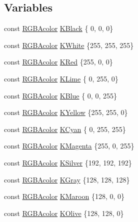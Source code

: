\subsection*{Variables}
\begin{DoxyCompactItemize}
\item 
const \hyperlink{classns_graphics_1_1_r_g_b_acolor}{R\+G\+B\+Acolor} \hyperlink{namespacens_graphics_abf1d83a5438e750a393a0333bd9d5bd8}{K\+Black} \{ 0, 0, 0\}
\item 
const \hyperlink{classns_graphics_1_1_r_g_b_acolor}{R\+G\+B\+Acolor} \hyperlink{namespacens_graphics_a8c5fcb477a548c6ed321748ec8383bb2}{K\+White} \{255, 255, 255\}
\item 
const \hyperlink{classns_graphics_1_1_r_g_b_acolor}{R\+G\+B\+Acolor} \hyperlink{namespacens_graphics_a2eb081113194e8ff44aebd697c2cfe61}{K\+Red} \{255, 0, 0\}
\item 
const \hyperlink{classns_graphics_1_1_r_g_b_acolor}{R\+G\+B\+Acolor} \hyperlink{namespacens_graphics_abfa46e909a7f8d4d908e70e4b55f734c}{K\+Lime} \{ 0, 255, 0\}
\item 
const \hyperlink{classns_graphics_1_1_r_g_b_acolor}{R\+G\+B\+Acolor} \hyperlink{namespacens_graphics_a64e9d947b926cdb9a7359e1d6f45a81e}{K\+Blue} \{ 0, 0, 255\}
\item 
const \hyperlink{classns_graphics_1_1_r_g_b_acolor}{R\+G\+B\+Acolor} \hyperlink{namespacens_graphics_a445ddb81e2a910db8e01a70403988966}{K\+Yellow} \{255, 255, 0\}
\item 
const \hyperlink{classns_graphics_1_1_r_g_b_acolor}{R\+G\+B\+Acolor} \hyperlink{namespacens_graphics_ac3f029049cd7ede1dfa2c788749029ad}{K\+Cyan} \{ 0, 255, 255\}
\item 
const \hyperlink{classns_graphics_1_1_r_g_b_acolor}{R\+G\+B\+Acolor} \hyperlink{namespacens_graphics_ad0a8ee009f367326525d2cbd47cd5dea}{K\+Magenta} \{255, 0, 255\}
\item 
const \hyperlink{classns_graphics_1_1_r_g_b_acolor}{R\+G\+B\+Acolor} \hyperlink{namespacens_graphics_a44884fe5a7841edbad80039e8ad4017c}{K\+Silver} \{192, 192, 192\}
\item 
const \hyperlink{classns_graphics_1_1_r_g_b_acolor}{R\+G\+B\+Acolor} \hyperlink{namespacens_graphics_a96ad8f5e0a09dba209c3359c277dcc6f}{K\+Gray} \{128, 128, 128\}
\item 
const \hyperlink{classns_graphics_1_1_r_g_b_acolor}{R\+G\+B\+Acolor} \hyperlink{namespacens_graphics_a219354b4276a9edbfc436390ba3a4827}{K\+Maroon} \{128, 0, 0\}
\item 
const \hyperlink{classns_graphics_1_1_r_g_b_acolor}{R\+G\+B\+Acolor} \hyperlink{namespacens_graphics_a11591ce1586e827d54a3d10b2fe3fc0c}{K\+Olive} \{128, 128, 0\}

\end{DoxyCompactItemize}
